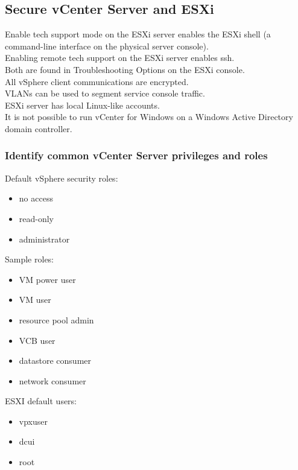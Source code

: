 \subsection{Secure vCenter Server and ESXi}

Enable tech support mode on the ESXi server enables the ESXi shell
(a command-line interface on the physical server console).\\

Enabling remote tech support on the ESXi server enables ssh.\\

Both are found in Troubleshooting Options on the ESXi console.\\

All vSphere client communications are encrypted.\\

VLANs can be used to segment service console traffic.\\

ESXi server has local Linux-like accounts.\\

It is not possible to run vCenter for Windows on a Windows Active Directory
domain controller.

\subsubsection{Identify common vCenter Server privileges and roles}

Default vSphere security roles:

\begin{itemize}
\item no access
\item read-only
\item administrator
\end{itemize}

Sample roles:

\begin{itemize}
\item VM power user
\item VM user
\item resource pool admin
\item VCB user
\item datastore consumer
\item network consumer
\end{itemize}

ESXI default users:

\begin{itemize}
\item vpxuser
\item dcui
\item root
\end{itemize}

